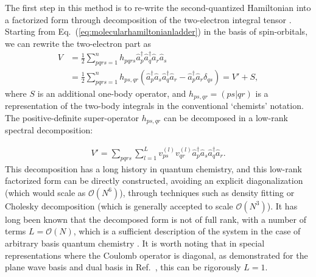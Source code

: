 The first step in this method is to re-write the second-quantized Hamiltonian into a factorized form through decomposition of the two-electron integral tensor \cite{Berry2019, Motta2021, Huggins2021}. Starting from Eq.~(\ref{eq:molecularhamiltonianladder}) in the basis of spin-orbitals, we can rewrite the two-electron part as
\begin{align} \label{eq:two_body_decomp}
    V &= \frac{1}{2} \sum_{pqrs=1}^{n} h_{pqrs} \hat{a}_{p}^{\dagger} \hat{a}_{q}^{\dagger} \hat{a}_{r} \hat{a}_{s} \\
    &= \frac{1}{2} \sum_{pqrs=1}^{n} h_{ps,qr} (\hat{a}_{p}^{\dagger} \hat{a}_s \hat{a}_{q}^{\dagger} \hat{a}_r - \hat{a}_p^{\dagger} \hat{a}_r \delta_{qs}) = V' + S ,
\end{align}
where $S$ is an additional one-body operator, and $h_{ps,qr}=(ps|qr)$ is a representation of the two-body integrals in the conventional `chemists' notation. The positive-definite super-operator $h_{ps,qr}$ can be decomposed in a low-rank spectral decomposition:

\begin{align} \label{eq:spectral_decomposition_two_RDM}
    V' = \sum_{pqrs} \sum_{l=1}^L v_{ps}^{(l)} v_{qr}^{(l)} \hat{a}_p^{\dagger} \hat{a}_s \hat{a}_q^{\dagger} \hat{a}_r.
\end{align}
This decomposition has a long history in quantum chemistry, and this low-rank factorized form can be directly constructed, avoiding an explicit diagonalization (which would scale as $\mathcal{O}(N^6)$), through techniques such as density fitting or Cholesky decomposition \cite{Pedersen2009, Beebe1977, Koch2003, Purwanto2011, Mardirossian2018, Peng2017} (which is generally accepted to scale $\mathcal{O}(N^3)$). It has long been known that the decomposed form is not of full rank, with a number of terms $L = \mathcal{O}(N)$, which is a sufficient description of the system in the case of arbitrary basis quantum chemistry \cite{Pedersen2009}. It is worth noting that in special representations where the Coulomb operator is diagonal, as demonstrated for the plane wave basis and dual basis in Ref.~\cite{Babbush2018}, this can be rigorously $L=1$.

